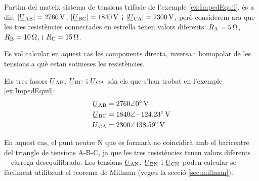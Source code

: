 \begin{exemple}\label{ex:ImpedDesequil}
	\addcontentsxms{\ImpedDesequil}
    Partim del mateix sistema de tensions trifàsic de l'exemple \vref{ex:ImpedEquil}, és a dir: $|\cmplx{U}\ped{AB}| =  \qty{2760}{V}$, $|\cmplx{U}\ped{BC}| = \qty{1840}{V}$ i
    $|\cmplx{U}\ped{CA}| = \qty{2300}{V}$, però considerem ara que les tres resistències connectades en estrella tenen valors diferents:  $R_\mathrm{A}=\qty{5}{\ohm}$, $R_\mathrm{B}=\qty{10}{\ohm}$,  i $R_\mathrm{C}=\qty{15}{\ohm}$.

    \begin{center}
        
    \end{center}

    Es vol calcular en aquest cas  les components directa, inversa i homopolar de les tensions a què estan sotmeses les resistències.

    Els tres fasors $\cmplx{U}\ped{AB} $, $\cmplx{U}\ped{BC} $ i $\cmplx{U}\ped{CA}$ són els que s'han trobat en l'exemple \ref{ex:ImpedEquil}:
    \begin{align*}
        \cmplx{U}\ped{AB} &= \complexqty{2760:0}{V} \\
        \cmplx{U}\ped{BC} &= \complexqty{1840:-124,23}{V} \\
        \cmplx{U}\ped{CA} &= \complexqty{2300:138,59}{V}
    \end{align*}

    En aquest cas, el punt neutre N que es formarà no coincidirà amb el baricentre del triangle de tensions A-B-C, ja que les tres resistències tenen valors diferents ---càrrega  desequilibrada. Les tensions $\cmplx{U}\ped{AN} $, $\cmplx{U}\ped{BN} $ i $\cmplx{U}\ped{CN}$ poden calcular-se fàcilment utilitzant el teorema de Millman (vegeu la secció \vref{sec:millman}).


\end{exemple}
